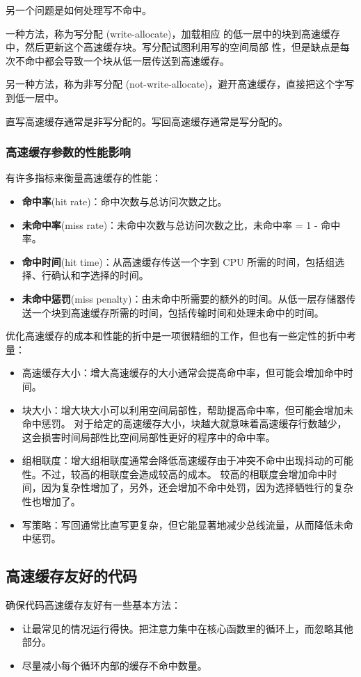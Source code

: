 另一个问题是如何处理写不命中。

一种方法，称为写分配 (write-allocate)，加载相应
的低一层中的块到高速缓存中，然后更新这个高速缓存块。写分配试图利用写的空间局部
性，但是缺点是每次不命中都会导致一个块从低一层传送到高速缓存。

另一种方法，称为非写分配 (not-write-allocate)，避开高速缓存，直接把这个字写到低一层中。

直写高速缓存通常是非写分配的。写回高速缓存通常是写分配的。

\subsubsection{高速缓存参数的性能影响}
有许多指标来衡量高速缓存的性能：
\begin{itemize}
    \item \textbf{命中率}(hit rate)：命中次数与总访问次数之比。
    \item \textbf{未命中率}(miss rate)：未命中次数与总访问次数之比，未命中率 = 1 - 命中率。
    \item \textbf{命中时间}(hit time)：从高速缓存传送一个字到 CPU 所需的时间，包括组选择、行确认和字选择的时间。
    \item \textbf{未命中惩罚}(miss penalty)：由未命中所需要的额外的时间。从低一层存储器传送一个块到高速缓存所需的时间，包括传输时间和处理未命中的时间。
\end{itemize}

优化高速缓存的成本和性能的折中是一项很精细的工作，但也有一些定性的折中考量：
\begin{itemize}
    \item 高速缓存大小：增大高速缓存的大小通常会提高命中率，但可能会增加命中时间。
    \item 块大小：增大块大小可以利用空间局部性，帮助提高命中率，但可能会增加未命中惩罚。
          对于给定的高速缓存大小，块越大就意味着高速缓存行数越少，这会损害时间局部性比空间局部性更好的程序中的命中率。
    \item 组相联度：增大组相联度通常会降低高速缓存由于冲突不命中出现抖动的可能性。不过，较高的相联度会造成较高的成本。
          较高的相联度会增加命中时间，因为复杂性增加了，另外，还会增加不命中处罚，因为选择牺牲行的复杂性也增加了。
    \item 写策略：写回通常比直写更复杂，但它能显著地减少总线流量，从而降低未命中惩罚。
\end{itemize}

\subsection{高速缓存友好的代码}
确保代码高速缓存友好有一些基本方法：
\begin{itemize}
    \item 让最常见的情况运行得快。把注意力集中在核心函数里的循环上，而忽略其他部分。
    \item 尽量减小每个循环内部的缓存不命中数量。
\end{itemize}

